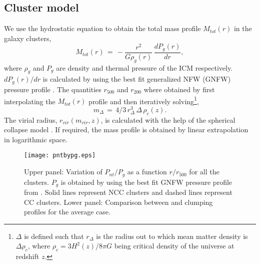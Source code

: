 \documentclass[a4paper,fleqn,usenatbib]{mnras}
\begin{document}
\subsection{Cluster model}
We use the hydrostatic equation to obtain the  total mass profile $M_{tot}(r)$ in the galaxy clusters,
\begin{equation}
M_{tot}(r)\, =\,-\frac{r^2}{G\rho_g(r)}\,\frac{dP_g(r)}{dr},
\label{eqn1:eq1}
\end{equation}
where  $\rho_g$ and $P_g$ are density and thermal pressure of the ICM respectively. $dP_g(r)/dr$ is calculated by using the best fit generalized NFW (GNFW) pressure profile \citep{Planck2013a}.
The quantities $r_{500}$ and $r_{200}$ where obtained by first interpolating the $M_{tot}(r)$ profile and then iteratively solving\footnote{$\Delta$ is defined such that $r_{\Delta}$ is the radius out to which mean matter density is $\Delta \rho_c$, where $\rho_c=3H^2(z)/8\pi G$ 
being critical density of the universe at redshift $z$.},
\begin{equation}
m_{\Delta}\,=\,4/3\,r^3_{\Delta}\,\Delta \,\rho_c(z).
\label{m500}
\end{equation}
The virial radius, $r_{vir}(m_{vir},z)$, is calculated with the help of the spherical collapse model \citep{Bryan1998}.
If required, the mass profile is obtained by linear  extrapolation in  logarithmic space.
\begin{figure}
\begin{minipage}{9.7cm}
 \texttt{[image: pntbypg.eps]}
\end{minipage}
\caption{Upper panel: Variation of $P_{nt}/P_{g}$ as a function  $r/r_{500}$ for all the clusters. $P_g$ is obtained by using the best fit GNFW pressure profile from \citet{Planck2013a}. 
 Solid lines represent NCC clusters and dashed lines represent CC clusters. Lower panel: Comparison between \citet{Eckert2015} and \citet{Battaglia2015} clumping profiles for the average case.
}
\label{pressureanddensity}
\end{figure}
\end{document}
